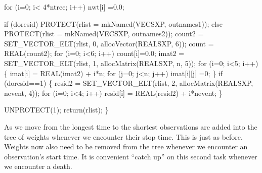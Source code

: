 \documentclass{article}
\begin{document}
\begin{nwchunk}
     for (i=0; i< 4*ntree; i++) nwt[i] =0.0;
     
     if (doresid) PROTECT(rlist = mkNamed(VECSXP, outnames1));
     else  PROTECT(rlist = mkNamed(VECSXP, outnames2));
     count2 = SET_VECTOR_ELT(rlist, 0, allocVector(REALSXP, 6));
     count = REAL(count2); 
     for (i=0; i<6; i++) count[i]=0.0;
     imat2 = SET_VECTOR_ELT(rlist, 1, allocMatrix(REALSXP, n, 5));
     for (i=0; i<5; i++) \{
         imat[i] = REAL(imat2) + i*n;
         for (j=0; j<n; j++) imat[i][j] =0;
     \}
     if (doresid==1) \{
         resid2 = SET_VECTOR_ELT(rlist, 2, allocMatrix(REALSXP, nevent, 4));
         for (i=0; i<4; i++) resid[i] = REAL(resid2) + i*nevent;
         \}
     
         
     UNPROTECT(1);
     return(rlist);
 \}
\end{nwchunk}

 As we move from the longest time to the shortest observations are added
    into the tree of weights whenever we encounter their stop time. 
    This is just as before.  Weights now also need to be removed from the 
    tree whenever we encounter an observation's start time.              %
    It is convenient ``catch up'' on this second task whenever we encounter 
    a death.
\end{document}

